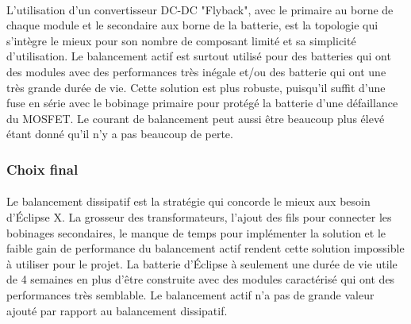 \paragraph*{}
L'utilisation d'un convertisseur DC-DC "Flyback", avec le primaire au borne de chaque module et le secondaire aux borne de la batterie, est la topologie qui s'intègre le mieux pour son nombre de composant limité et sa simplicité d'utilisation. Le balancement actif est surtout utilisé pour des batteries qui ont des modules avec des performances très inégale et/ou des batterie qui ont une très grande durée de vie. Cette solution est plus robuste, puisqu'il suffit d'une fuse en série avec le bobinage primaire pour protégé la batterie d'une défaillance du MOSFET. Le courant de balancement peut aussi être beaucoup plus élevé étant donné qu'il n'y a pas beaucoup de perte.

\subsubsection*{Choix final}
\paragraph*{}
Le balancement dissipatif est la stratégie qui concorde le mieux aux besoin d'Éclipse X. La grosseur des transformateurs, l'ajout des fils pour connecter les bobinages secondaires, le manque de temps pour implémenter la solution et le faible gain de performance du balancement actif rendent cette solution impossible à utiliser pour le projet. La batterie d'Éclipse à seulement une durée de vie utile de 4 semaines en plus d'être construite avec des modules caractérisé qui ont des performances très semblable. Le balancement actif n'a pas de grande valeur ajouté par rapport au balancement dissipatif.



